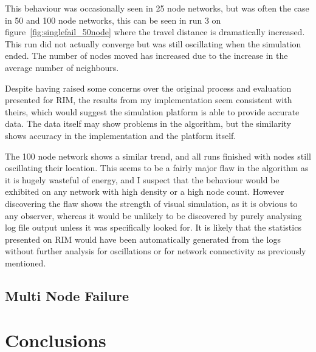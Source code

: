 \documentclass[authoryearcitations]{UoYCSproject}
\begin{document}
This behaviour was occasionally seen in 25 node networks, but was often the case in 50 and 100 node networks, this can be seen in run 3 on figure~\ref{fig:singlefail_50node} where the travel distance is dramatically increased. This run did not actually converge but was still oscillating when the simulation ended. The number of nodes moved has increased due to the increase in the average number of neighbours.

Despite having raised some concerns over the original process and evaluation presented for RIM, the results from my implementation seem consistent with theirs, which would suggest the simulation platform is able to provide accurate data. The data itself may show problems in the algorithm, but the similarity shows accuracy in the implementation and the platform itself.

The 100 node network shows a similar trend, and all runs finished with nodes still oscillating their location. This seems to be a fairly major flaw in the algorithm as it is hugely wasteful of energy, and I suspect that the behaviour would be exhibited on any network with high density or a high node count. However discovering the flaw shows the strength of visual simulation, as it is obvious to any observer, whereas it would be unlikely to be discovered by purely analysing log file output unless it was specifically looked for. It is likely that the statistics presented on RIM would have been automatically generated from the logs without further analysis for oscillations or for network connectivity as previously mentioned.

\section{Multi Node Failure}

\chapter{Conclusions}
\label{cha:Conclusion}






\end{document}
